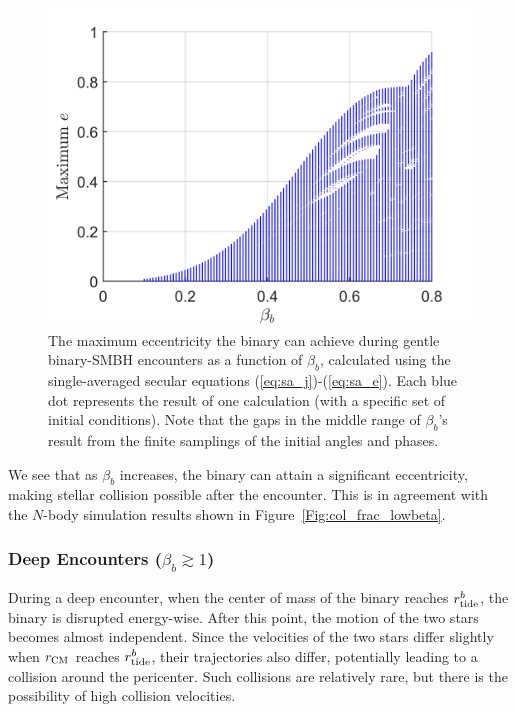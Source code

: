 \documentclass[twocolumn]{aastex631}
\begin{document}
\begin{figure}[htbp]
\centering
\includegraphics[width=1.02\columnwidth]{figures/Eexcitation.png}
\caption{
The maximum eccentricity the binary can achieve during gentle binary-SMBH encounters as a function of $\beta_b$, calculated using the single-averaged secular equations (\ref{eq:sa_j})-(\ref{eq:sa_e}).
Each blue dot represents the result of one calculation (with a specific set of initial conditions). 
Note that the gaps in the middle range of $\beta_b$'s result from the finite samplings of the initial angles and phases.}
\label{Fig:Eexcitation}
\end{figure}

We see that as $\beta_b$ increases, the binary can attain a significant eccentricity, making stellar collision possible after the encounter. 
This is in agreement with the $N$-body simulation results shown in Figure~\ref{Fig:col_frac_lowbeta}.


\subsubsection{Deep Encounters (\texorpdfstring{$\beta_b \gtrsim 1$}{β>1})}
\label{sec:br_regime2}

During a deep encounter, when the center of mass of the binary reaches $r_{\rm tide}^b$, the binary is disrupted energy-wise. 
After this point, the motion of the two stars becomes almost independent. 
Since the velocities of the two stars differ slightly when $r_{\rm CM}$ reaches $r_{\rm tide}^b$, their trajectories also differ, potentially leading to a collision around the pericenter. 
Such collisions are relatively rare, but there is the possibility of high collision velocities.
\end{document}

